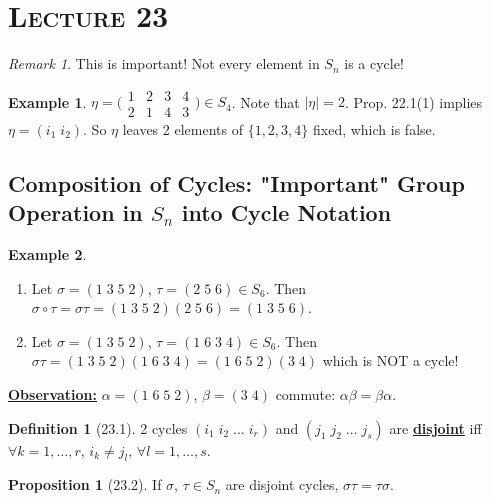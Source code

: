 \documentclass{article}
\newcommand{\define}[1]{\textbf{\underline{#1}}}
\theoremstyle{definition}
\newtheorem*{defn}{Definition}
\newtheorem*{prop}{Proposition}
\newtheorem*{ex}{Example}
\theoremstyle{remark}
\newtheorem*{rmk}{Remark}
\begin{document}
    \section*{\textbf{\textsc{Lecture 23}}}{
        \begin{rmk}
            This is important! Not every element in $S_n$ is a cycle!
        \end{rmk}
        
        \begin{ex}
            $\eta=\big(\begin{smallmatrix} 1&2&3&4\\ 2&1&4&3 \end{smallmatrix}\big)\in S_4$. Note that $|\eta|=2$. Prop. 22.1(1) implies $\eta=(i_1\;i_2)$. So $\eta$ leaves 2 elements of $\{1,2,3,4\}$ fixed, which is false.
        \end{ex}
        
        \subsection*{Composition of Cycles: "Important" Group Operation in $S_n$ into Cycle Notation}{
            \begin{ex}
                \begin{enumerate}
                    \item Let $\sigma=(1\;3\;5\;2)$, $\tau=(2\;5\;6)\in S_6$. Then $\sigma\circ\tau=\sigma\tau=(1\;3\;5\;2)(2\;5\;6)=(1\;3\;5\;6)$.
                    \item Let $\sigma=(1\;3\;5\;2)$, $\tau=(1\;6\;3\;4)\in S_6$. Then $\sigma\tau=(1\;3\;5\;2)(1\;6\;3\;4)=(1\;6\;5\;2)(3\;4)$ which is NOT a cycle!
                \end{enumerate}
            \end{ex}
            
            \noindent\define{Observation:} $\alpha=(1\;6\;5\;2)$, $\beta=(3\;4)$ commute: $\alpha\beta=\beta\alpha$.
            
            \begin{defn}[23.1]
                2 cycles $(i_1\;i_2\;\ldots\;i_r)$ and $(j_1\;j_2\;\ldots\;j_s)$ are \define{disjoint} iff $\forall k=1,\ldots,r$, $i_k\neq j_l$, $\forall l=1,\ldots,s$.
            \end{defn}
            
            \begin{prop}[23.2]
                If $\sigma$, $\tau \in S_n$ are disjoint cycles, $\sigma\tau=\tau\sigma$.
            \end{prop}
            
}}
\end{document}
